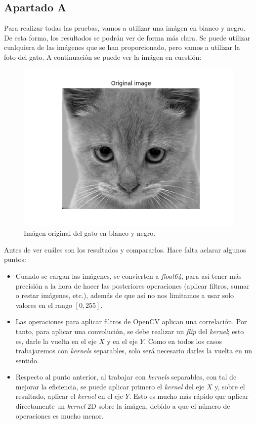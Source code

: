 \documentclass[11pt,a4paper]{article}
\begin{document}
\subsection{Apartado A}

Para realizar todas las pruebas, vamos a utilizar una imágen en blanco y negro. De esta forma, los resultados se podrán
ver de forma más clara. Se puede utilizar cualquiera de las imágenes que se han proporcionado, pero vamos a utilizar
la foto del gato. A continuación se puede ver la imágen en cuestión:

\begin{figure}[H]
\centering
\includegraphics[scale=0.6]{img/cat.png}
\caption{Imágen original del gato en blanco y negro.}
\label{fig:cat}
\end{figure}

Antes de ver cuáles son los resultados y compararlos. Hace falta aclarar algunos puntos:

\begin{itemize}
	\item Cuando se cargan las imágenes, se convierten a \textit{float64}, para así tener más precisión a la hora de
	hacer las posteriores operaciones (aplicar filtros, sumar o restar imágenes, etc.), además de que así no nos limitamos
	a usar solo valores en el rango $[0, 255]$.
	\item Las operaciones para aplicar filtros de OpenCV aplican una correlación. Por tanto, para aplicar una convolución,
	se debe realizar un \textit{flip} del \textit{kernel}; esto es, darle la vuelta en el eje $X$ y en el eje $Y$.
	Como en todos los casos trabajaremos con \textit{kernels} separables, solo será necesario darles la vuelta en un sentido.
	\item Respecto al punto anterior, al trabajar con \textit{kernels} separables, con tal de mejorar la eficiencia,
	se puede aplicar primero el \textit{kernel} del eje $X$ y, sobre el resultado, aplicar el \textit{kernel} en el
	eje $Y$. Esto es mucho más rápido que aplicar directamente un \textit{kernel} 2D sobre la imágen, debido a que el
	número de operaciones es mucho menor.
\end{itemize}
\end{document}

